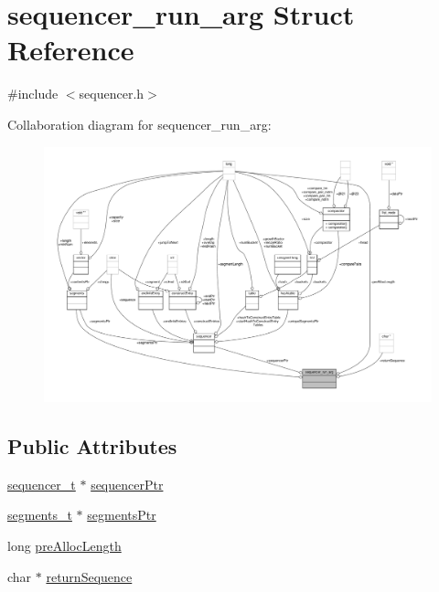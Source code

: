 \hypertarget{structsequencer__run__arg}{\section{sequencer\-\_\-run\-\_\-arg Struct Reference}
\label{structsequencer__run__arg}
}


{\ttfamily \#include $<$sequencer.\-h$>$}



Collaboration diagram for sequencer\-\_\-run\-\_\-arg\-:
\nopagebreak
\begin{figure}[H]
\begin{center}
\leavevmode
\includegraphics[width=350pt]{structsequencer__run__arg__coll__graph}
\end{center}
\end{figure}
\subsection*{Public Attributes}
\begin{DoxyCompactItemize}
\item 
\hyperlink{sequencer_8h_ab4f6bc3538a4fb91977fd80b4a29d574}{sequencer\-\_\-t} $\ast$ \hyperlink{structsequencer__run__arg_ac42a149eb5d281ad9d11defc19d4668d}{sequencer\-Ptr}
\item 
\hyperlink{segments_8h_a6b833f170e932d51264176fcd9dd0bed}{segments\-\_\-t} $\ast$ \hyperlink{structsequencer__run__arg_a706577675c53ef200da45648a9d9ac35}{segments\-Ptr}
\item 
long \hyperlink{structsequencer__run__arg_affa4e41e3f021686e5c8a2033eca2448}{pre\-Alloc\-Length}
\item 
char $\ast$ \hyperlink{structsequencer__run__arg_a14fa65be071d6224345a237c7133c62f}{return\-Sequence}
\end{DoxyCompactItemize}


